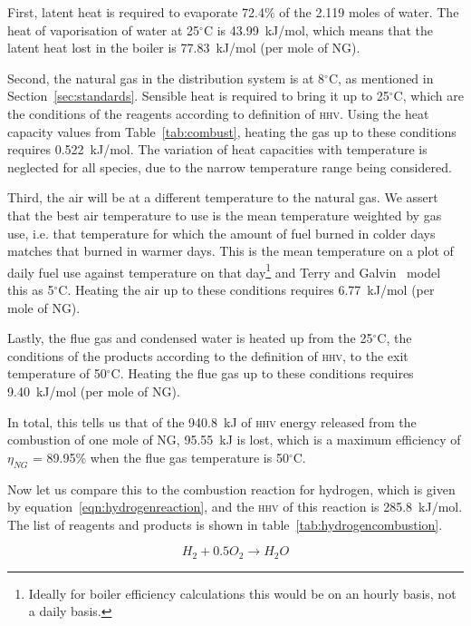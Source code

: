 \documentclass[5p]{elsarticle} %
\begin{document}
First, latent heat is required to evaporate 72.4\% of the 2.119 moles of water.
The heat of vaporisation of water at 25$^{\circ}$C is 43.99~kJ/mol, which means that the latent heat lost in the boiler is 77.83~kJ/mol (per mole of NG).

Second, the natural gas in the distribution system is at 8$^{\circ}$C, as mentioned in Section~\ref{sec:standards}. 
Sensible heat is required to bring it up to 25$^{\circ}$C, which are the conditions of the reagents according to definition of \textsc{hhv}.
Using the heat capacity values from Table~\ref{tab:combust}, heating the gas up to these conditions requires 0.522~kJ/mol.
The variation of heat capacities with temperature is neglected for all species, due to the narrow temperature range being considered.

Third, the air will be at a different temperature to the natural gas. 
We assert that the best air temperature to use is the mean temperature weighted by gas use, i.e. that temperature for which the amount of fuel burned in colder days matches that burned in warmer days. 
This is the mean temperature on a plot of daily fuel use against temperature on that day\footnote{Ideally for boiler efficiency calculations this would be on an hourly basis, not a daily basis.} and Terry and Galvin~\citep{Terry2023} model this as 5$^\circ$C.
Heating the air up to these conditions requires 6.77~kJ/mol (per mole of NG).

Lastly, the flue gas and condensed water is heated up from the 25$^\circ$C, the conditions of the products according to the definition of \textsc{hhv}, to the exit temperature of 50$^{\circ}$C.
Heating the flue gas up to these conditions requires 9.40~kJ/mol (per mole of NG).

In total, this tells us that of the 940.8~kJ of \textsc{hhv} energy released from the combustion of one mole of NG, 95.55~kJ is lost, which is a maximum efficiency of $\eta_{NG}$ = 89.95\% when the flue gas temperature is 50$^{\circ}$C.

Now let us compare this to the combustion reaction for hydrogen, which is given by equation~\eqref{eqn:hydrogenreaction}, and the \textsc{hhv} of this reaction is 285.8~kJ/mol.
The list of reagents and products is shown in table~\ref{tab:hydrogencombustion}.

\begin{equation}
    \label{eqn:hydrogenreaction}
    H_2 + 0.5 O_2 \longrightarrow H_2 O
\end{equation}
\end{document}
